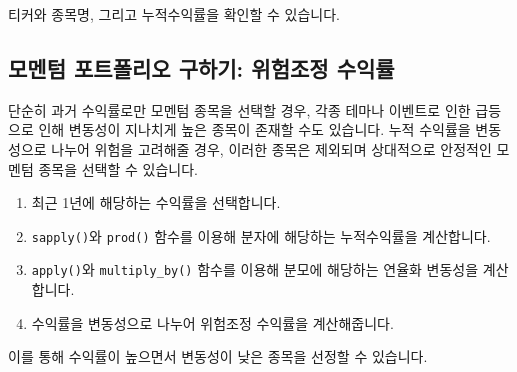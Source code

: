 \documentclass[12pt,]{book}
\newenvironment{Shaded}{\begin{snugshade}}{\end{snugshade}}
\newcommand{\ControlFlowTok}[1]{\textcolor[rgb]{0.13,0.29,0.53}{\textbf{#1}}}
\newcommand{\DecValTok}[1]{\textcolor[rgb]{0.00,0.00,0.81}{#1}}
\newcommand{\KeywordTok}[1]{\textcolor[rgb]{0.13,0.29,0.53}{\textbf{#1}}}
\newcommand{\NormalTok}[1]{#1}
\newcommand{\OperatorTok}[1]{\textcolor[rgb]{0.81,0.36,0.00}{\textbf{#1}}}
\newcommand{\StringTok}[1]{\textcolor[rgb]{0.31,0.60,0.02}{#1}}
\providecommand{\tightlist}{%
  \setlength{\itemsep}{0pt}\setlength{\parskip}{0pt}}
\begin{document}
티커와 종목명, 그리고 누적수익률을 확인할 수 있습니다.

\hypertarget{section-54}{%
\subsection{모멘텀 포트폴리오 구하기: 위험조정 수익률}\label{section-54}}

단순히 과거 수익률로만 모멘텀 종목을 선택할 경우, 각종 테마나 이벤트로 인한 급등으로 인해 변동성이 지나치게 높은 종목이 존재할 수도 있습니다. 누적 수익률을 변동성으로 나누어 위험을 고려해줄 경우, 이러한 종목은 제외되며 상대적으로 안정적인 모멘텀 종목을 선택할 수 있습니다.

\begin{Shaded}
\end{Shaded}

\begin{enumerate}
\def\labelenumi{\arabic{enumi}.}
\tightlist
\item
  최근 1년에 해당하는 수익률을 선택합니다.
\item
  \texttt{sapply()}와 \texttt{prod()} 함수를 이용해 분자에 해당하는 누적수익률을 계산합니다.
\item
  \texttt{apply()}와 \texttt{multiply\_by()} 함수를 이용해 분모에 해당하는 연율화 변동성을 계산합니다.
\item
  수익률을 변동성으로 나누어 위험조정 수익률을 계산해줍니다.
\end{enumerate}

이를 통해 수익률이 높으면서 변동성이 낮은 종목을 선정할 수 있습니다.
\end{document}

